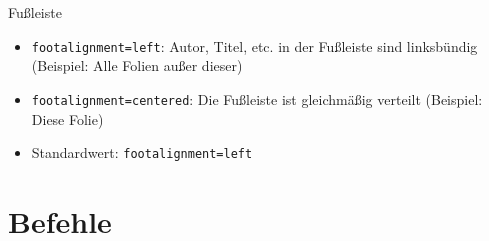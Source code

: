 \documentclass[german,10pt,xcolor=colortbl,compress
]{beamer}
\begin{document}
\def\rptufootalignment{centered}%
\begin{frame}{Fußleiste}
	\begin{itemize}
		\item \lstinline|footalignment=left|: Autor, Titel, etc. in der Fußleiste sind linksbündig (Beispiel: Alle Folien außer dieser)
		\item \lstinline|footalignment=centered|: Die Fußleiste ist gleichmäßig verteilt (Beispiel: Diese Folie)
		\item Standardwert: \lstinline|footalignment=left|
	\end{itemize}
\end{frame}
\def\rptufootalignment{left}%
\section{Befehle}
\end{document}
